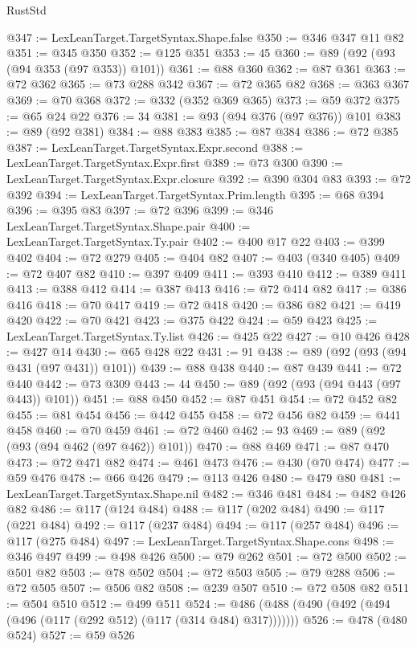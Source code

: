 \begin{lexlean}{RustStd}
\begin{coremodule}
@347 := LexLeanTarget.TargetSyntax.Shape.false
@350 := @346 @347 @11 @82
@351 := @345 @350
@352 := @125 @351
@353 := 45
@360 := @89 (@92 (@93 (@94 @353 (@97 @353)) @101))
@361 := @88 @360
@362 := @87 @361
@363 := @72 @362
@365 := @73 @288 @342
@367 := @72 @365 @82
@368 := @363 @367
@369 := @70 @368
@372 := @332 (@352 @369 @365)
@373 := @59 @372
@375 := @65 @24 @22
@376 := 34
@381 := @93 (@94 @376 (@97 @376)) @101
@383 := @89 (@92 @381)
@384 := @88 @383
@385 := @87 @384
@386 := @72 @385
@387 := LexLeanTarget.TargetSyntax.Expr.second
@388 := LexLeanTarget.TargetSyntax.Expr.first
@389 := @73 @300
@390 := LexLeanTarget.TargetSyntax.Expr.closure
@392 := @390 @304 @83
@393 := @72 @392
@394 := LexLeanTarget.TargetSyntax.Prim.length
@395 := @68 @394
@396 := @395 @83
@397 := @72 @396
@399 := @346 LexLeanTarget.TargetSyntax.Shape.pair
@400 := LexLeanTarget.TargetSyntax.Ty.pair
@402 := @400 @17 @22
@403 := @399 @402
@404 := @72 @279
@405 := @404 @82
@407 := @403 (@340 @405)
@409 := @72 @407 @82
@410 := @397 @409
@411 := @393 @410
@412 := @389 @411
@413 := @388 @412
@414 := @387 @413
@416 := @72 @414 @82
@417 := @386 @416
@418 := @70 @417
@419 := @72 @418
@420 := @386 @82
@421 := @419 @420
@422 := @70 @421
@423 := @375 @422
@424 := @59 @423
@425 := LexLeanTarget.TargetSyntax.Ty.list
@426 := @425 @22
@427 := @10 @426
@428 := @427 @14
@430 := @65 @428 @22
@431 := 91
@438 := @89 (@92 (@93 (@94 @431 (@97 @431)) @101))
@439 := @88 @438
@440 := @87 @439
@441 := @72 @440
@442 := @73 @309
@443 := 44
@450 := @89 (@92 (@93 (@94 @443 (@97 @443)) @101))
@451 := @88 @450
@452 := @87 @451
@454 := @72 @452 @82
@455 := @81 @454
@456 := @442 @455
@458 := @72 @456 @82
@459 := @441 @458
@460 := @70 @459
@461 := @72 @460
@462 := 93
@469 := @89 (@92 (@93 (@94 @462 (@97 @462)) @101))
@470 := @88 @469
@471 := @87 @470
@473 := @72 @471 @82
@474 := @461 @473
@476 := @430 (@70 @474)
@477 := @59 @476
@478 := @66 @426
@479 := @113 @426
@480 := @479 @80
@481 := LexLeanTarget.TargetSyntax.Shape.nil
@482 := @346 @481
@484 := @482 @426 @82
@486 := @117 (@124 @484)
@488 := @117 (@202 @484)
@490 := @117 (@221 @484)
@492 := @117 (@237 @484)
@494 := @117 (@257 @484)
@496 := @117 (@275 @484)
@497 := LexLeanTarget.TargetSyntax.Shape.cons
@498 := @346 @497
@499 := @498 @426
@500 := @79 @262
@501 := @72 @500
@502 := @501 @82
@503 := @78 @502
@504 := @72 @503
@505 := @79 @288
@506 := @72 @505
@507 := @506 @82
@508 := @239 @507
@510 := @72 @508 @82
@511 := @504 @510
@512 := @499 @511
@524 := @486 (@488 (@490 (@492 (@494 (@496 (@117 (@292 @512) (@117 (@314 @484) @317)))))))
@526 := @478 (@480 @524)
@527 := @59 @526

\end{coremodule}
\end{lexlean}
